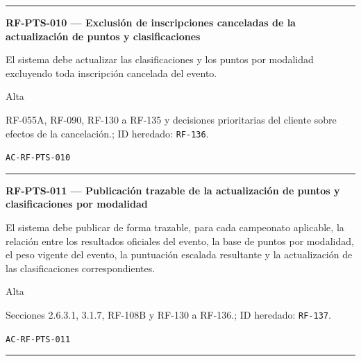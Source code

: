 \documentclass[10pt,letterpaper]{article}
\begin{document}
\vspace{0.25em}\hrule\vspace{0.65em}
\noindent\textbf{RF-PTS-010 --- Exclusión de inscripciones canceladas de la actualización de puntos y clasificaciones}\par
\begin{description}[style=nextline,leftmargin=3.15cm,labelwidth=2.8cm,font=\normalfont\bfseries]
\item[Obligación] El sistema debe actualizar las clasificaciones y los puntos por modalidad excluyendo toda inscripción cancelada del evento.
\item[Prioridad] Alta
\item[Procedencia] RF-055A, RF-090, RF-130 a RF-135 y decisiones prioritarias del cliente sobre efectos de la cancelación.; ID heredado: \texttt{RF-136}.
\item[Verificación] \texttt{AC-RF-PTS-010}
\end{description}
\vspace{0.25em}\hrule\vspace{0.65em}
\noindent\textbf{RF-PTS-011 --- Publicación trazable de la actualización de puntos y clasificaciones por modalidad}\par
\begin{description}[style=nextline,leftmargin=3.15cm,labelwidth=2.8cm,font=\normalfont\bfseries]
\item[Obligación] El sistema debe publicar de forma trazable, para cada campeonato aplicable, la relación entre los resultados oficiales del evento, la base de puntos por modalidad, el peso vigente del evento, la puntuación escalada resultante y la actualización de las clasificaciones correspondientes.
\item[Prioridad] Alta
\item[Procedencia] Secciones 2.6.3.1, 3.1.7, RF-108B y RF-130 a RF-136.; ID heredado: \texttt{RF-137}.
\item[Verificación] \texttt{AC-RF-PTS-011}
\end{description}
\vspace{0.25em}\hrule\vspace{0.65em}
\end{document}
